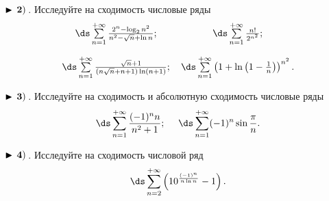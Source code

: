 $\bf\blacktriangleright\,2)\,$. Исследуйте на сходимость числовые ряды
\begin{equation*}
    \begin{array}{ccc}
        \,\ds\sum\limits_{n=1}^{+\infty}\frac{2^n-\log_2 n^2}{n^2-\sqrt{n}+\ln n}

        ; &   \,
\ds\sum\limits_{n=1}^{+\infty}\frac{n!}{2^{n^2}}

        ; \\[6mm]
        \,
\ds\sum\limits_{n=1}^{+\infty}\frac{\sqrt{n}+1}{(n\sqrt{n}+n+1)\ln (n+1)}

        ; &    \,
\ds\sum\limits_{n=1}^{+\infty}\left(1+\ln\left(1-\frac{1}{n}\right)\right)^{n^2}

        .
    \end{array}
\end{equation*}


$\bf\blacktriangleright\,3)\,$. Исследуйте на сходимость и абсолютную сходимость числовые ряды
\begin{equation*}
    \,\ds\sum\limits_{n=1}^{+\infty}\frac{(-1)^n n}{n^2+1}

    ;\quad\,   \,
\ds\sum\limits_{n=1}^{+\infty}(-1)^n\sin\frac{\pi}{n}

    .
\end{equation*}


$\bf\blacktriangleright\,4)\,$. Исследуйте на сходимость числовой ряд
\begin{equation*}
    \,
\ds\sum\limits_{n=2}^{+\infty}\left(10^{\frac{(-1)^n}{n\ln n}}-1\right)
    .
\end{equation*}
